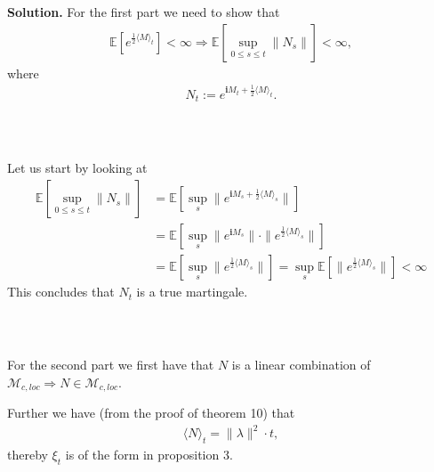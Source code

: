 \documentclass{beamer}
\numberwithin{equation}{section}
\newenvironment{frame2}{\begin{frame}\frametitle{{\normalsize \secname} \\ {\large \subsecname}}}{\end{frame}}
\begin{document}
\begin{frame2}
    \textbf{Solution.}
    For the first part we need to show that
    \begin{align}
        \mathbb{E}\left[e^{\frac{1}{2}\langle M \rangle_t}\right] < \infty \Rightarrow \mathbb{E}\left[\sup_{0 \leq s \leq t}\| N_s \|\right] < \infty,
    \end{align}
    where
    \begin{align}
        N_t := e^{\textbf{i}M_t + \frac{1}{2}\langle M \rangle_t}.
    \end{align}
\end{frame2}

\begin{frame2}
    Let us start by looking at
    \begin{align}
        \mathbb{E}\left[\sup_{0 \leq s \leq t} \| N_s \| \right] &= \mathbb{E}\left[\sup_s \| e^{\textbf{i}M_s + \frac{1}{2}\langle M \rangle_s} \|\right]\\
        &= \mathbb{E}\left[\sup_s \| e^{\textbf{i}M_s} \| \cdot \|e^{\frac{1}{2}\langle M \rangle_s} \|\right] \\
        &= \mathbb{E}\left[\sup_s \|e^{\frac{1}{2}\langle M \rangle_s}\|\right] = \sup_s \mathbb{E}\left[ \|e^{\frac{1}{2}\langle M \rangle_s} \|\right] < \infty
    \end{align}
    This concludes that $N_t$ is a true martingale. 
\end{frame2}

\begin{frame2}
    For the second part we first have that $N$ is a linear combination of $\mathcal{M}_{c,loc} \Rightarrow N \in \mathcal{M}_{c,loc}$.
    
    \vspace{10pt}
    Further we have (from the proof of theorem 10) that
    \begin{align}
        \langle N \rangle_t = \| \lambda \|^2 \cdot t,
    \end{align}
    thereby $\xi_t$ is of the form in proposition 3.
\end{frame2}
\end{document}
